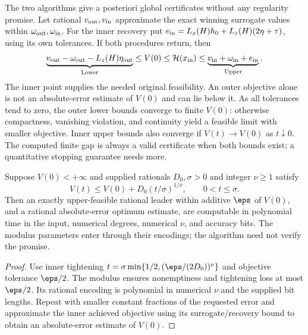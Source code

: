 The two algorithms give a posteriori global certificates without any
regularity promise. Let rational $v_{\rm out},v_{\rm in}$ approximate
the exact winning surrogate values within $\omega_{\rm out},\omega_{\rm in}$.
For the inner recovery put
$e_{\rm in}=L_x(H)h_0+L_z(H)(2\eta+\tau)$, using its own tolerances.
If both procedures return, then
\begin{equation}\label{eq:accuracy-posterior}
 \underbrace{v_{\rm out}-\omega_{\rm out}-L_z(H)\eta_{\rm out}}_{\mathrm{Lower}}
 \le V(0)\le\mathcal H(x_{\rm in})\le
 \underbrace{v_{\rm in}+\omega_{\rm in}+e_{\rm in}}_{\mathrm{Upper}}.
\end{equation}
The inner point supplies the needed original feasibility. An outer
objective alone is not an absolute-error estimate of $V(0)$ and can
lie below it. As all tolerances tend to zero, the outer lower bounds
converge to finite $V(0)$: otherwise compactness, vanishing violation,
and continuity yield a feasible limit with smaller objective. Inner
upper bounds also converge if $V(t)\to V(0)$ as $t\downarrow0$.
The computed finite gap is always a valid certificate when both
bounds exist; a quantitative stopping guarantee needs more.

\begin{corollary}
\label{cor:accuracy-tightening}
Suppose $V(0)<+\infty$ and supplied rationals $D_0,\sigma>0$ and
integer $\nu\ge1$ satisfy
\begin{equation}\label{eq:tightening-modulus}
 V(t)\le V(0)+D_0(t/\sigma)^{1/\nu},\qquad0<t\le\sigma.
\end{equation}
Then an exactly upper-feasible rational leader within additive $\eps$
of $V(0)$, and a rational absolute-error optimum estimate, are computable
in polynomial time in the input, numerical degrees, numerical $\nu$,
and accuracy bits. The modulus parameters enter through their encodings;
the algorithm need not verify the promise.
\end{corollary}
\begin{proof}
Use inner tightening
$t=\sigma\min\{1/2,(\eps/(2D_0))^\nu\}$ and objective tolerance
$\eps/2$. The modulus ensures nonemptiness and tightening loss at
most $\eps/2$. Its rational encoding is polynomial in numerical
$\nu$ and the supplied bit lengths. Repeat with smaller constant
fractions of the requested error and approximate the inner achieved
objective using its surrogate/recovery bound to obtain an absolute-error
estimate of $V(0)$.
\end{proof}

